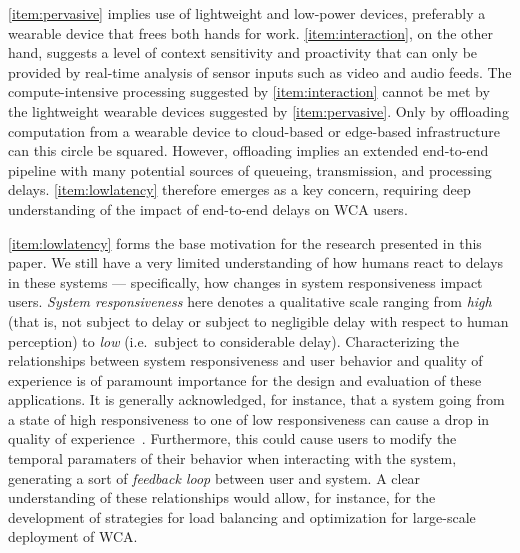 \documentclass[10pt,letterpaper]{article}
\providecommand{\DIFaddtex}[1]{#1} %
\providecommand{\DIFdeltex}[1]{} %
\providecommand{\DIFaddbegin}{\protect\color{blue}} %
\providecommand{\DIFaddend}{\protect\color{black}} %
\providecommand{\DIFdelbegin}{\protect\color{red}} %
\providecommand{\DIFdelend}{\protect\color{black}} %
\providecommand{\DIFadd}[1]{\texorpdfstring{\DIFaddtex{#1}}{#1}} %
\providecommand{\DIFdel}[1]{\texorpdfstring{\DIFdeltex{#1}}{}} %
\newcommand{\DIFscaledelfig}{0.5}
\newlength{\DIFdelgraphicswidth} %
\newlength{\DIFdelgraphicsheight} %
\newcommand{\DIFaddincludegraphics}[2][]{{\color{blue}\fbox{\DIFOincludegraphics[#1]{#2}}}} %
\newcommand{\DIFdelincludegraphics}[2][]{%
\sbox{\DIFdelgraphicsbox}{\DIFOincludegraphics[#1]{#2}}%
\settoboxwidth{\DIFdelgraphicswidth}{\DIFdelgraphicsbox} %
\settoboxtotalheight{\DIFdelgraphicsheight}{\DIFdelgraphicsbox} %
\scalebox{\DIFscaledelfig}{%
\parbox[b]{\DIFdelgraphicswidth}{\usebox{\DIFdelgraphicsbox}\\[-\baselineskip] \rule{\DIFdelgraphicswidth}{0em}}\llap{\resizebox{\DIFdelgraphicswidth}{\DIFdelgraphicsheight}{%
\setlength{\unitlength}{\DIFdelgraphicswidth}%
\begin{picture}(1,1)%
\thicklines\linethickness{2pt} %
{\color[rgb]{1,0,0}\put(0,0){\framebox(1,1){}}}%
{\color[rgb]{1,0,0}\put(0,0){\line( 1,1){1}}}%
{\color[rgb]{1,0,0}\put(0,1){\line(1,-1){1}}}%
\end{picture}%
}\hspace*{3pt}}} %
} %
\DeclareRobustCommand{\DIFaddbegin}{\DIFOaddbegin \let\includegraphics\DIFaddincludegraphics} %
\DeclareRobustCommand{\DIFaddend}{\DIFOaddend \let\includegraphics\DIFOincludegraphics} %
\DeclareRobustCommand{\DIFdelbegin}{\DIFOdelbegin \let\includegraphics\DIFdelincludegraphics} %
\DeclareRobustCommand{\DIFdelend}{\DIFOaddend \let\includegraphics\DIFOincludegraphics} %
\begin{document}
\cref{item:pervasive} implies use of lightweight and low-power devices, preferably a wearable device that frees both hands for work.
\cref{item:interaction}, on the other hand, suggests a level of context sensitivity and proactivity that can only be provided by real-time analysis of sensor inputs such as video and audio feeds.
The compute-intensive processing suggested by \cref{item:interaction} cannot be met by the lightweight wearable devices suggested by \cref{item:pervasive}.
Only by offloading computation from a wearable device to cloud-based or edge-based infrastructure can this circle be squared.
However, offloading implies an extended end-to-end pipeline with many potential sources of queueing, transmission, and processing delays.
\cref{item:lowlatency} therefore emerges as a key concern, requiring deep understanding of the impact of end-to-end delays on WCA users.

\cref{item:lowlatency} forms the base motivation for the research presented in this paper.
We still have a very limited understanding of how humans react to delays in these systems --- specifically, how changes in system responsiveness impact users.
\emph{System responsiveness} here denotes a qualitative scale ranging from \emph{high} (that is, not subject to delay or subject to negligible delay with respect to human perception) to \emph{low} (i.e.\ subject to considerable delay).
Characterizing the relationships between system responsiveness and user behavior and \DIFaddbegin \DIFadd{quality of }\DIFaddend experience is of paramount importance for the design and evaluation of these applications.
\DIFaddbegin \DIFadd{It is generally acknowledged, for instance, that a system going from a state of high responsiveness to one of low responsiveness can cause a drop in quality of experience~}\autocite{dabrowsky:2011:40years}\DIFadd{. 
Furthermore, this could cause users to modify the temporal paramaters of their behavior when interacting with the system, generating a sort of \emph{feedback loop} between user and system.
}\DIFaddend A clear understanding of these relationships would allow, for instance, for the development of strategies for load balancing and optimization for large-scale \DIFdelbegin \DIFdel{deployments }\DIFdelend \DIFaddbegin \DIFadd{deployment }\DIFaddend of WCA.\@
\end{document}
